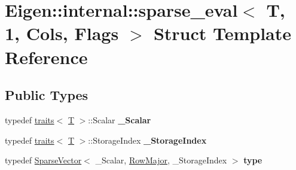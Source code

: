 \hypertarget{struct_eigen_1_1internal_1_1sparse__eval_3_01_t_00_011_00_01_cols_00_01_flags_01_4}{}\section{Eigen\+:\+:internal\+:\+:sparse\+\_\+eval$<$ T, 1, Cols, Flags $>$ Struct Template Reference}
\label{struct_eigen_1_1internal_1_1sparse__eval_3_01_t_00_011_00_01_cols_00_01_flags_01_4}
\subsection*{Public Types}
\begin{DoxyCompactItemize}
\item 
\mbox{\label{struct_eigen_1_1internal_1_1sparse__eval_3_01_t_00_011_00_01_cols_00_01_flags_01_4_ae20e9d4371cac378f9de6fe9c384e9c1}} 
typedef \hyperlink{struct_eigen_1_1internal_1_1traits}{traits}$<$ \hyperlink{group___sparse_core___module}{T} $>$\+::Scalar {\bfseries \+\_\+\+Scalar}
\item 
\mbox{\label{struct_eigen_1_1internal_1_1sparse__eval_3_01_t_00_011_00_01_cols_00_01_flags_01_4_ae04531ef2d607818bf5fc2797943da5b}} 
typedef \hyperlink{struct_eigen_1_1internal_1_1traits}{traits}$<$ \hyperlink{group___sparse_core___module}{T} $>$\+::Storage\+Index {\bfseries \+\_\+\+Storage\+Index}
\item 
\mbox{\label{struct_eigen_1_1internal_1_1sparse__eval_3_01_t_00_011_00_01_cols_00_01_flags_01_4_a4652d925d593f6f613d6e43197f33c42}} 
typedef \hyperlink{group___sparse_core___module_class_eigen_1_1_sparse_vector}{Sparse\+Vector}$<$ \+\_\+\+Scalar, \hyperlink{group__enums_ggaacded1a18ae58b0f554751f6cdf9eb13acfcde9cd8677c5f7caf6bd603666aae3}{Row\+Major}, \+\_\+\+Storage\+Index $>$ {\bfseries type}
\item 
\mbox{\label{struct_eigen_1_1internal_1_1sparse__eval_3_01_t_00_011_00_01_cols_00_01_flags_01_4_ae20e9d4371cac378f9de6fe9c384e9c1}} 

\end{DoxyCompactItemize}
